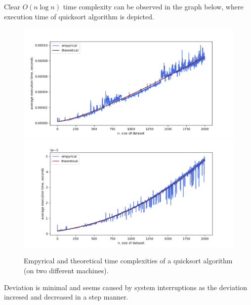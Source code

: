 \documentclass[12pt, a4paper]{article}
\begin{document}
Clear $O(n \log n)$ time complexity can be observed in the graph below, where execution time of quicksort algorithm is depicted.
\begin{figure}[!h]
\centering
\includegraphics[width=\textwidth]{quicksort.png}
\includegraphics[width=\textwidth]{valeria/quicksort.png}
\caption{Empyrical and theoretical time complexities of a quicksort algorithm (on two different machines).}
\end{figure}

Deviation is minimal and seems caused by system interruptions as the deviation incresed and decreased in a step manner.

\newpage
\end{document}
